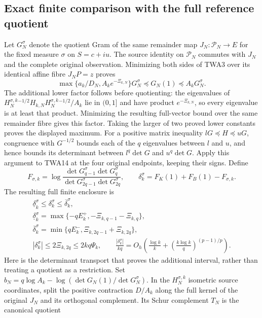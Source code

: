 \subsection{Exact finite comparison with the full reference quotient}

Let $G_N^\sigma$ denote the quotient Gram of the same remainder
map $J_N:\mathcal P_N\to E$ for the fixed measure $\sigma$ on
$S=c+iu$. The source identity on $\mathcal P_N$ commutes with
$J_N$ and the complete original observation. Minimizing both sides
of TWA3 over its identical affine fibre $J_NP=z$ proves
\[
\max\{a_k/D_N,A_ke^{-\Xi_{k,N}}\}G_N^\sigma
       \preceq G_N(1)\preceq A_kG_N^\sigma.
\tag{TWA14}
\]
The additional lower factor follows before quotienting:
the eigenvalues of $H_N^{\sigma,k}{}^{-1/2}H_{k,N}
H_N^{\sigma,k}{}^{-1/2}/A_k$ lie in $(0,1]$ and have product
$e^{-\Xi_{k,N}}$, so every eigenvalue is at least that product.
Minimizing the resulting full-vector bound over the same
remainder fibre gives this factor. Taking the larger of two
proved lower constants proves the displayed maximum.
For a positive matrix inequality $lG\preceq H\preceq uG$,
congruence with $G^{-1/2}$ bounds each of the $q$ eigenvalues
between $l$ and $u$, and hence bounds its determinant between
$l^q\det G$ and $u^q\det G$. Apply this argument to TWA14
at the four original endpoints, keeping their signs. Define
\[
F_{\sigma,k}=\log\frac{\det G_{q-1}^\sigma\det G_q^\sigma}
{\det G_{2q-1}^\sigma\det G_{2q}^\sigma},\qquad
\delta_k^\sigma=F_K(1)+F_B(1)-F_{\sigma,k}.
\]
The resulting full finite enclosure is
\[
\begin{gathered}
 \underline\delta_k^\sigma\leq\delta_k^\sigma
                         \leq\overline\delta_k^\sigma,\\
 \underline\delta_k^\sigma
 =\max\{-qE_k^+,-\Xi_{k,q-1}-\Xi_{k,q}\},\\
 \overline\delta_k^\sigma
 =\min\{qE_k^-,\Xi_{k,2q-1}+\Xi_{k,2q}\},\\
 |\delta_k^\sigma|\leq2\Xi_{k,2q}\leq2kq\Psi_k,\qquad
 \frac{|\delta_k^\sigma|}{kq}
 =O_h\!\left(\frac{\log k}{k}
       +\left(\frac{k\log k}{q}\right)^{(p-1)/p}\right).
\end{gathered}\tag{TWA15}
\]
Here is the determinant transport that proves the additional
interval, rather than treating a quotient as a restriction.
Set $b_N=q\log A_k-\log(\det G_N(1)/\det G_N^\sigma)$.
In the $H_N^{\sigma,k}$ isometric source coordinates,
split the positive contraction $D/A_k$ along the full kernel
of the original $J_N$ and its orthogonal complement.
Its Schur complement $T_N$ is the canonical quotient
